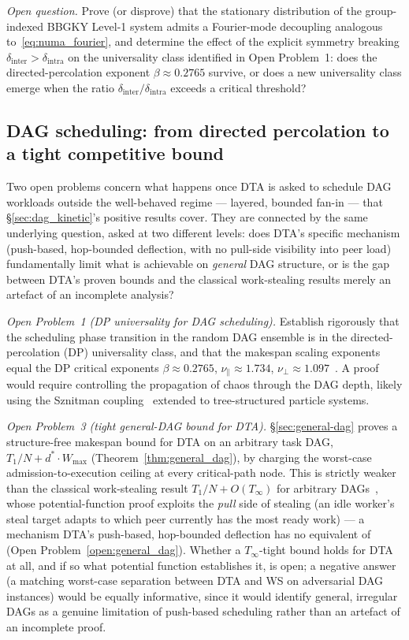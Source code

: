 \documentclass[11pt,a4paper]{report}
\begin{document}
\medskip
\noindent\textit{Open question.}
Prove (or disprove) that the stationary distribution of the group-indexed
BBGKY Level-1 system admits a Fourier-mode decoupling analogous
to~\eqref{eq:numa_fourier}, and determine the effect of the explicit
symmetry breaking $\delta_{\mathrm{inter}} > \delta_{\mathrm{intra}}$ on
the universality class identified in Open Problem~1: does the directed-percolation
exponent $\beta \approx 0.2765$ survive, or does a new universality class
emerge when the ratio $\delta_{\mathrm{inter}}/\delta_{\mathrm{intra}}$
exceeds a critical threshold?

\subsection{DAG scheduling: from directed percolation to a tight competitive bound}

Two open problems concern what happens once DTA is asked to schedule
DAG workloads outside the well-behaved regime --- layered, bounded
fan-in --- that \S\ref{sec:dag_kinetic}'s positive results cover. They
are connected by the same underlying question, asked at two different
levels: does DTA's specific mechanism (push-based, hop-bounded
deflection, with no pull-side visibility into peer load) fundamentally
limit what is achievable on \emph{general} DAG structure, or is the
gap between DTA's proven bounds and the classical work-stealing
results merely an artefact of an incomplete analysis?

\medskip
\noindent\textit{Open Problem~1 (DP universality for DAG scheduling).}
Establish rigorously that the scheduling phase transition in the random
DAG ensemble is in the directed-percolation (DP) universality class,
and that the makespan scaling exponents equal the DP critical exponents
$\beta \approx 0.2765$, $\nu_\parallel \approx 1.734$,
$\nu_\perp \approx 1.097$~\cite{hinrichsen2000}.
A proof would require controlling the propagation of chaos through the
DAG depth, likely using the Sznitman coupling~\cite{sznitman1991}
extended to tree-structured particle systems.

\medskip
\noindent\textit{Open Problem~3 (tight general-DAG bound for DTA).}
\S\ref{sec:general-dag} proves a structure-free makespan bound
for DTA on an arbitrary task DAG, $T_1/N + d^*\cdot W_{\max}$
(Theorem~\ref{thm:general_dag}), by charging the worst-case
admission-to-execution ceiling at every critical-path node. This is
strictly weaker than the classical work-stealing result
$T_1/N + O(T_\infty)$ for arbitrary DAGs~\cite{blumofe1999,arora2001},
whose potential-function proof exploits the \emph{pull} side of
stealing (an idle worker's steal target adapts to which peer currently
has the most ready work) --- a mechanism DTA's push-based, hop-bounded
deflection has no equivalent of (Open Problem~\ref{open:general_dag}).
Whether a $T_\infty$-tight bound holds for DTA at all, and if so what
potential function establishes it, is open; a negative answer (a
matching worst-case separation between DTA and WS on adversarial DAG
instances) would be equally informative, since it would identify
general, irregular DAGs as a genuine limitation of push-based
scheduling rather than an artefact of an incomplete proof.
\end{document}
